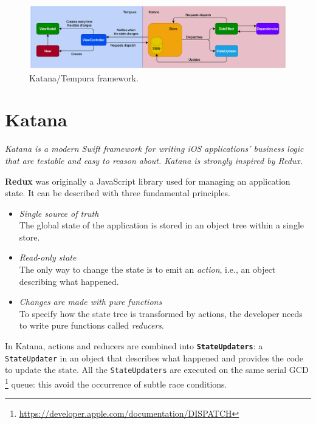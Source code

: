 \documentclass[a4paper, 11pt, parskip=half]{scrreprt}
\theoremstyle{definition}
\newenvironment{linedquote}{
	\begin{mdframed}[style=linedquote]
}{
	\end{mdframed}
}
\begin{document}
\begin{figure}[H]
    \centering
    \includegraphics[width=0.99\linewidth, keepaspectratio]{Katana-Tempura-light}
    \caption{Katana/Tempura framework.}
\end{figure}

\section{Katana}

\begin{linedquote}
    \textit{Katana is a modern Swift framework for writing iOS applications' business logic that are testable and easy to reason about. Katana is strongly inspired by Redux.}
\end{linedquote}

\textbf{Redux} was originally a JavaScript library used for managing an application state. It can be described with three fundamental principles.
\begin{itemize}
    \item \textit{Single source of truth} \\
    The global state of the application is stored in an object tree within a single store.
    \item \textit{Read-only state} \\
    The only way to change the state is to emit an \textit{action}, i.e., an object describing what happened.
    \item \textit{Changes are made with pure functions} \\
    To specify how the state tree is transformed by actions, the developer needs to write pure functions called \textit{reducers}.
\end{itemize}

In Katana, actions and reducers are combined into \textbf{\texttt{StateUpdaters}}: a \texttt{StateUpdater} in an object that describes what happened and provides the code to update the state. All the \texttt{StateUpdaters} are executed on the same serial GCD \footnote{\href{https://developer.apple.com/documentation/DISPATCH}{https://developer.apple.com/documentation/DISPATCH}} queue: this avoid the occurrence of subtle race conditions.
\end{document}
